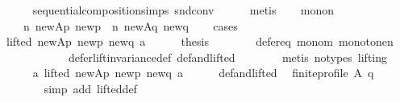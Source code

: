\begin{isabellebody}
\ \ \ \ \isamarkupfalse%
\ sequential{\isacharunderscore}{\kern0pt}composition{\isachardot}{\kern0pt}simps\ snd{\isacharunderscore}{\kern0pt}conv\isanewline
\ \ \ \ \isamarkupfalse%
\ metis\isanewline
\ \ \isamarkupfalse%
\ mono{\isacharunderscore}{\kern0pt}n{\isacharcolon}{\kern0pt}\isanewline
\ \ \ \ {\isachardoublequoteopen}n\ {\isacharquery}{\kern0pt}new{\isacharunderscore}{\kern0pt}Ap\ {\isacharquery}{\kern0pt}new{\isacharunderscore}{\kern0pt}p\ {\isacharequal}{\kern0pt}\ n\ {\isacharquery}{\kern0pt}new{\isacharunderscore}{\kern0pt}Aq\ {\isacharquery}{\kern0pt}new{\isacharunderscore}{\kern0pt}q{\isachardoublequoteclose}\isanewline
\ \ \isamarkupfalse%
\ cases\isanewline
\ \ \ \ \isamarkupfalse%
\ {\isachardoublequoteopen}lifted\ {\isacharquery}{\kern0pt}new{\isacharunderscore}{\kern0pt}Ap\ {\isacharquery}{\kern0pt}new{\isacharunderscore}{\kern0pt}p\ {\isacharquery}{\kern0pt}new{\isacharunderscore}{\kern0pt}q\ a{\isachardoublequoteclose}\isanewline
\ \ \ \ \isamarkupfalse%
\ {\isacharquery}{\kern0pt}thesis\isanewline
\ \ \ \ \ \ \isamarkupfalse%
\ defer{\isacharunderscore}{\kern0pt}eq\ mono{\isacharunderscore}{\kern0pt}m\ monotone{\isacharunderscore}{\kern0pt}n\isanewline
\ \ \ \ \ \ \ \ \ \ \ \ defer{\isacharunderscore}{\kern0pt}lift{\isacharunderscore}{\kern0pt}invariance{\isacharunderscore}{\kern0pt}def\ def{\isacharunderscore}{\kern0pt}and{\isacharunderscore}{\kern0pt}lifted\isanewline
\ \ \ \ \ \ \isamarkupfalse%
\ {\isacharparenleft}{\kern0pt}metis\ {\isacharparenleft}{\kern0pt}no{\isacharunderscore}{\kern0pt}types{\isacharcomma}{\kern0pt}\ lifting{\isacharparenright}{\kern0pt}{\isacharparenright}{\kern0pt}\isanewline
\ \ \isamarkupfalse%
\isanewline
\ \ \ \ \isamarkupfalse%
\ a{}{\isacharcolon}{\kern0pt}\ {\isachardoublequoteopen}{\isasymnot}lifted\ {\isacharquery}{\kern0pt}new{\isacharunderscore}{\kern0pt}Ap\ {\isacharquery}{\kern0pt}new{\isacharunderscore}{\kern0pt}p\ {\isacharquery}{\kern0pt}new{\isacharunderscore}{\kern0pt}q\ a{\isachardoublequoteclose}\isanewline
\ \ \ \ \isamarkupfalse%
\ def{\isacharunderscore}{\kern0pt}and{\isacharunderscore}{\kern0pt}lifted\ \isamarkupfalse%
\ {\isachardoublequoteopen}finite{\isacharunderscore}{\kern0pt}profile\ A\ q{\isachardoublequoteclose}\isanewline
\ \ \ \ \ \ \isamarkupfalse%
\ {\isacharparenleft}{\kern0pt}simp\ add{\isacharcolon}{\kern0pt}\ lifted{\isacharunderscore}{\kern0pt}def{\isacharparenright}{\kern0pt}\isanewline

\end{isabellebody}
